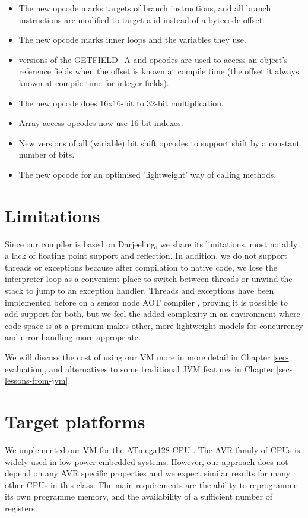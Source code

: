 \begin{itemize}
  \item The new  opcode marks targets of branch instructions, and all branch instructions are modified to target a  id instead of a bytecode offset.
  \item The new  opcode marks inner loops and the variables they use.
  \item {} versions of the {GETFIELD\_A} and  opcodes are used to access an object's reference fields when the offset is known at compile time (the offset it always known at compile time for integer fields).
  \item The new  opcode does 16x16-bit to 32-bit multiplication.
  \item Array access opcodes now use 16-bit indexes.
  \item New  versions of all (variable) bit shift opcodes to support shift by a constant number of bits.
  \item The new  opcode for an optimised 'lightweight' way of calling methods.
\end{itemize}


\section{Limitations}
Since our compiler is based on Darjeeling, we share its limitations, most notably a lack of floating point support and reflection. In addition, we do not support threads or exceptions because after compilation to native code, we lose the interpreter loop as a convenient place to switch between threads or unwind the stack to jump to an exception handler. Threads and exceptions have been implemented before on a sensor node AOT compiler \cite{Ellul:2012thesis}, proving it is possible to add support for both, but we feel the added complexity in an environment where code space is at a premium makes other, more lightweight models for concurrency and error handling more appropriate.

We will discuss the cost of using our VM more in more detail in Chapter \ref{sec-evaluation}, and alternatives to some traditional JVM features in Chapter \ref{sec-lessons-from-jvm}.


\section{Target platforms}
We implemented our VM for the ATmega128 CPU \cite{Atmel:ATmega128Datasheet}. The AVR family of CPUs is widely used in low power embedded systems. However, our approach does not depend on any AVR specific properties and we expect similar results for many other CPUs in this class. The main requirements are the ability to reprogramme its own programme memory, and the availability of a sufficient number of registers.

